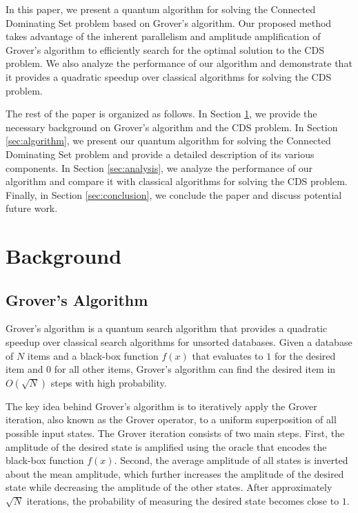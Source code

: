 In this paper, we present a quantum algorithm for solving the Connected Dominating Set problem based on Grover's algorithm. Our proposed method takes advantage of the inherent parallelism and amplitude amplification of Grover's algorithm to efficiently search for the optimal solution to the CDS problem. We also analyze the performance of our algorithm and demonstrate that it provides a quadratic speedup over classical algorithms for solving the CDS problem.

The rest of the paper is organized as follows. In Section \ref{sec:background}, we provide the necessary background on Grover's algorithm and the CDS problem. In Section \ref{sec:algorithm}, we present our quantum algorithm for solving the Connected Dominating Set problem and provide a detailed description of its various components. In Section \ref{sec:analysis}, we analyze the performance of our algorithm and compare it with classical algorithms for solving the CDS problem. Finally, in Section \ref{sec:conclusion}, we conclude the paper and discuss potential future work.

\section{Background}
\label{sec:background}

\subsection{Grover's Algorithm}

Grover's algorithm \cite{grover1996} is a quantum search algorithm that provides a quadratic speedup over classical search algorithms for unsorted databases. Given a database of $N$ items and a black-box function $f(x)$ that evaluates to $1$ for the desired item and $0$ for all other items, Grover's algorithm can find the desired item in $O(\sqrt{N})$ steps with high probability.

The key idea behind Grover's algorithm is to iteratively apply the Grover iteration, also known as the Grover operator, to a uniform superposition of all possible input states. The Grover iteration consists of two main steps. First, the amplitude of the desired state is amplified using the oracle that encodes the black-box function $f(x)$. Second, the average amplitude of all states is inverted about the mean amplitude, which further increases the amplitude of the desired state while decreasing the amplitude of the other states. After approximately $\sqrt{N}$ iterations, the probability of measuring the desired state becomes close to $1$.


